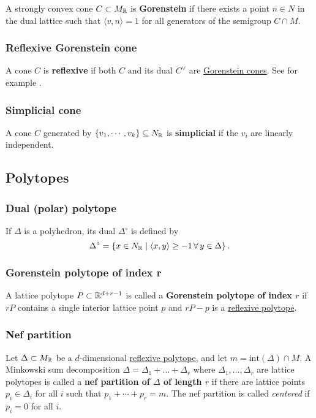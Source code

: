 \documentclass[11pt, english]{article}
\begin{document}
A strongly convex cone $C \subset M_{\mathbb{R}}$ is \textbf{Gorenstein} if there exists a point $n \in N$ in the dual lattice such that $\langle v,n \rangle = 1$ for all generators of the semigroup $C \cap M$.

\subsubsection{Reflexive Gorenstein cone}
\label{reflexivegorensteincone}

A cone $C$ is \textbf{reflexive} if both $C$ and its dual $C^\vee$ are \hyperref[gorensteincone]{Gorenstein cones}. See for example \cite{mirrorsymalggeo}.

\subsubsection{Simplicial cone}
A cone $C$ generated by $\{v_1, \cdots, v_k \} \subseteq N_{\mathbb{R}}$ is \textbf{simplicial} if the $v_i$ are linearly independent.

\subsection{Polytopes}

\subsubsection{Dual (polar) polytope}
\label{polarpolyhedron}

If $\Delta$ is a polyhedron, its dual $\Delta^\circ$ is defined by
\[
\Delta^\circ = \left\{ x \in N_{\mathbb{R}} \mid \langle x,y\rangle \geq -1 \,\forall \, y \in \Delta \right\}.
\]

\subsubsection{Gorenstein polytope of index r}
\label{gorensteinpolytope}
A lattice polytope $P \subset \mathbb{R}^{d+r-1}$ is called a \textbf{Gorenstein polytope of index $r$} if $rP$ contains a single interior lattice point $p$ and $rP-p$ is a \hyperref[reflexivepolytope]{reflexive polytope}.

\subsubsection{Nef partition}
\label{nefpartition}
Let $\Delta \subset M_{\mathbb{R}}$ be a $d$-dimensional \hyperref[reflexivepolytope]{reflexive polytope}, and let $m=\mathrm{int}(\Delta) \cap M$. A Minkowski sum decomposition $\Delta=\Delta_1+\dotsc +\Delta_r$ where $\Delta_1,\ldots,\Delta_r$ are lattice polytopes is called a \textbf{nef partition of $\Delta$ of length $r$} if there are lattice points $p_i \in \Delta_i$ for all $i$ such that $p_1+\cdots+p_r = m$. The nef partition is called \emph{centered} if $p_i=0$  for all $i$. 
\end{document}

